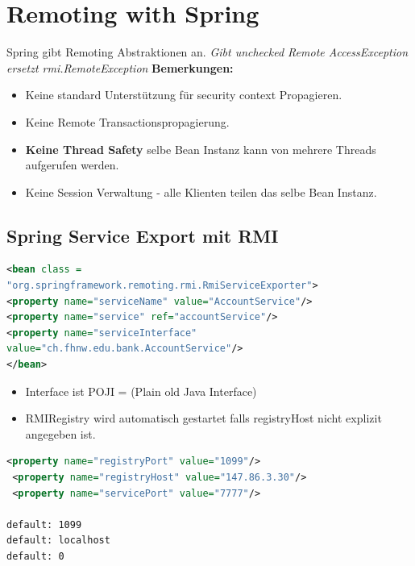\documentclass[a4paper,10pt]{scrreprt}
\begin{document}
\chapter{Remoting with Spring}
 
Spring gibt Remoting Abstraktionen an.
\textit{Gibt unchecked Remote AccessException ersetzt rmi.RemoteException}
\textbf{Bemerkungen:}
\begin{itemize}
 \item Keine standard Unterstützung für security context Propagieren.
 \item Keine Remote Transactionspropagierung.
 \item \textbf{Keine Thread Safety} selbe Bean Instanz kann von mehrere Threads aufgerufen werden.
 \item Keine Session Verwaltung - alle Klienten teilen das selbe Bean Instanz.
 
\end{itemize}


\section{Spring Service Export mit RMI}
\begin{lstlisting}[caption=Spring Config fuer RMI,language=xml]
 <bean class =
"org.springframework.remoting.rmi.RmiServiceExporter">
<property name="serviceName" value="AccountService"/>
<property name="service" ref="accountService"/>
<property name="serviceInterface"
value="ch.fhnw.edu.bank.AccountService"/>
</bean>
\end{lstlisting}

\begin{itemize}
 \item Interface ist POJI = (Plain old Java Interface)
 \item RMIRegistry wird automatisch gestartet falls registryHost nicht explizit angegeben ist.
\end{itemize}

\begin{lstlisting}[caption=spring rmi configuration optionale Eigenschaften,language=xml]
 <property name="registryPort" value="1099"/>
 <property name="registryHost" value="147.86.3.30"/>
 <property name="servicePort" value="7777"/>

default: 1099
default: localhost
default: 0

\end{lstlisting}
\end{document}
